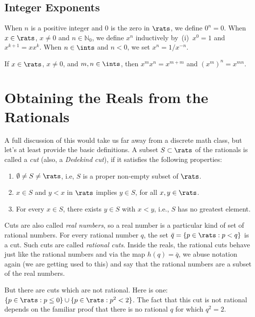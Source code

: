 \subsection{Integer Exponents}

When $n$ is a positive integer and $0$ is the zero in $\rats$, we
define $0^n=0$.  When $x\in\rats$, $x\neq 0$ and $n\in\mathbb{N}_0$,
we define $x^n$ inductively by~(i)~$x^0=1$ and $x^{k+1}=xx^k$.  When
$n\in\ints$ and $n<0$, we set $x^n=1/x^{-n}$.

\begin{theorem}
If $x\in\rats$, $x\neq0$, and $m,n\in\ints$, then
$x^mx^n=x^{m+m}$ and $(x^m)^n=x^{mn}$.
\end{theorem}

\section{Obtaining the Reals from the Rationals}\label{s:reals}

A full discussion of this would take us far away from 
a discrete math class, but let's at least provide the
basic definitions.  A subset $S\subset \rats$ of the rationals
is called a \textit{cut} (also, a \textit{Dedekind cut}), 
if it satisfies the following properties:

\begin{enumerate}
\item $\emptyset\neq S\neq \rats$, i.e, $S$ is a proper non-empty subset
of $\rats$.
\item $x\in S$ and $y<x$ in $\rats$ implies $y\in S$, for all $x,y\in \rats$.
\item For every $x\in S$, there exists $y\in S$ with $x<y$, i.e., 
$S$ has no greatest element.
\end{enumerate}

Cuts are also called \textit{real numbers}, so a real number is
a particular kind of set of rational numbers.
For every rational number $q$, the set $\bar{q}= \{p\in \rats: p< q\}$
is a cut.  Such cuts are called \textit{rational cuts}.  Inside
the reals, the rational cuts behave just like the rational
numbers and via the map $h(q)=\bar{q}$, we abuse notation again
(we are getting used to this) and say that
the rational numbers are a subset of the real numbers.  

But there are cuts which are not rational.  Here is one:
$\{p\in \rats: p\le 0\}\cup \{p\in \rats: p^2<2\}$.  The fact that
this cut is not rational depends on the familiar proof that
there is no rational $q$ for which $q^2=2$.

